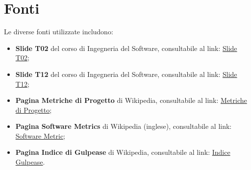 \section{Fonti}
Le diverse fonti utilizzate includono:
\begin{itemize}
    \item \textbf{Slide T02} del corso di Ingegneria del Software, consultabile al link: \href{https://www.math.unipd.it/~tullio/IS-1/2022/Dispense/T02.pdf}{Slide T02};
    \item \textbf{Slide T12} del corso di Ingegneria del Software, consultabile al link: \href{https://www.math.unipd.it/~tullio/IS-1/2022/Dispense/T12.pdf}{Slide T12};
    \item \textbf{Pagina Metriche di Progetto} di Wikipedia, consultabile al link: \href{https://it.wikipedia.org/wiki/Metriche_di_progetto}{Metriche di Progetto};
    \item \textbf{Pagina Software Metrics} di Wikipedia (inglese), consultabile al link: \href{https://en.wikipedia.org/wiki/Software_metric}{Software Metric};
    \item \textbf{Pagina Indice di Gulpease} di Wikipedia, consultabile al link: \href{https://it.wikipedia.org/wiki/Indice_Gulpease}{Indice Gulpease}.
\end{itemize}